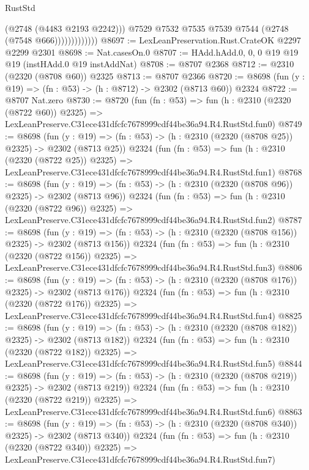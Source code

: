 \begin{lexlean}{RustStd}
\begin{coremodule}
                            (@2748 (@4483 @2193 @2242)))
                          @7529
                          @7532
                          @7535
                          @7539
                          @7544
                          (@2748 (@7548 @666)))))))))))))
@8697 := LexLeanPreservation.Rust.CrateOK @2297 @2299 @2301
@8698 := Nat.casesOn.{0}
@8707 := HAdd.hAdd.{0, 0, 0} @19 @19 @19 (instHAdd.{0} @19 instAddNat)
@8708 := @8707 @2368
@8712 := @2310 (@2320 (@8708 @60)) @2325
@8713 := @8707 @2366
@8720 := @8698 (fun (y : @19) => (fn : @53) -> (h : @8712) -> @2302 (@8713 @60)) @2324
@8722 := @8707 Nat.zero
@8730 := @8720
    (fun (fn : @53) =>
    fun (h : @2310 (@2320 (@8722 @60)) @2325) =>
    LexLeanPreserve.C31ece431dfcfc7678999cdf44be36a94.R4.RustStd.fun0)
@8749 := @8698
    (fun (y : @19) => (fn : @53) -> (h : @2310 (@2320 (@8708 @25)) @2325) -> @2302 (@8713 @25))
    @2324
    (fun (fn : @53) =>
    fun (h : @2310 (@2320 (@8722 @25)) @2325) =>
    LexLeanPreserve.C31ece431dfcfc7678999cdf44be36a94.R4.RustStd.fun1)
@8768 := @8698
    (fun (y : @19) => (fn : @53) -> (h : @2310 (@2320 (@8708 @96)) @2325) -> @2302 (@8713 @96))
    @2324
    (fun (fn : @53) =>
    fun (h : @2310 (@2320 (@8722 @96)) @2325) =>
    LexLeanPreserve.C31ece431dfcfc7678999cdf44be36a94.R4.RustStd.fun2)
@8787 := @8698
    (fun (y : @19) => (fn : @53) -> (h : @2310 (@2320 (@8708 @156)) @2325) -> @2302 (@8713 @156))
    @2324
    (fun (fn : @53) =>
    fun (h : @2310 (@2320 (@8722 @156)) @2325) =>
    LexLeanPreserve.C31ece431dfcfc7678999cdf44be36a94.R4.RustStd.fun3)
@8806 := @8698
    (fun (y : @19) => (fn : @53) -> (h : @2310 (@2320 (@8708 @176)) @2325) -> @2302 (@8713 @176))
    @2324
    (fun (fn : @53) =>
    fun (h : @2310 (@2320 (@8722 @176)) @2325) =>
    LexLeanPreserve.C31ece431dfcfc7678999cdf44be36a94.R4.RustStd.fun4)
@8825 := @8698
    (fun (y : @19) => (fn : @53) -> (h : @2310 (@2320 (@8708 @182)) @2325) -> @2302 (@8713 @182))
    @2324
    (fun (fn : @53) =>
    fun (h : @2310 (@2320 (@8722 @182)) @2325) =>
    LexLeanPreserve.C31ece431dfcfc7678999cdf44be36a94.R4.RustStd.fun5)
@8844 := @8698
    (fun (y : @19) => (fn : @53) -> (h : @2310 (@2320 (@8708 @219)) @2325) -> @2302 (@8713 @219))
    @2324
    (fun (fn : @53) =>
    fun (h : @2310 (@2320 (@8722 @219)) @2325) =>
    LexLeanPreserve.C31ece431dfcfc7678999cdf44be36a94.R4.RustStd.fun6)
@8863 := @8698
    (fun (y : @19) => (fn : @53) -> (h : @2310 (@2320 (@8708 @340)) @2325) -> @2302 (@8713 @340))
    @2324
    (fun (fn : @53) =>
    fun (h : @2310 (@2320 (@8722 @340)) @2325) =>
    LexLeanPreserve.C31ece431dfcfc7678999cdf44be36a94.R4.RustStd.fun7)

\end{coremodule}
\end{lexlean}
